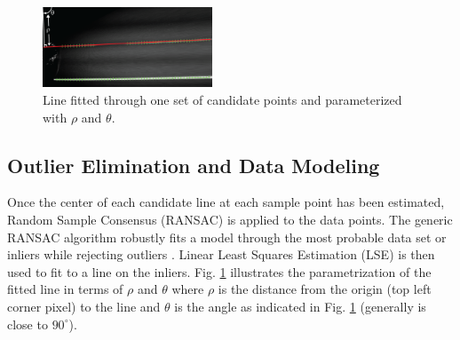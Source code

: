 \documentclass{article}
\begin{document}
\begin{figure}[htb]
  \centering
  \includegraphics[width=0.45\textwidth]{IMG/rho_theta.png}
  \caption{Line fitted through one set of candidate points and parameterized with $\rho$ and $\theta$.}
  \label{fig:cand_pts}
\end{figure}
\subsection{Outlier Elimination and Data Modeling}
Once the center of each candidate line at each sample point has been estimated, Random Sample Consensus (RANSAC) is applied to the data points. The generic RANSAC algorithm robustly fits a model through the most probable data set or inliers while rejecting outliers \cite{hartley_multiple_2004,fischler_random_1981}. Linear Least Squares Estimation (LSE) is then used to fit to a line on the inliers. Fig. \ref{fig:cand_pts} illustrates the parametrization of the fitted line in terms of $\rho$ and $\theta$ where $\rho$ is the distance from the origin (top left corner pixel) to the line and $\theta$ is the angle as indicated in Fig. \ref{fig:cand_pts} (generally is close to $90^\circ$).
\end{document}
